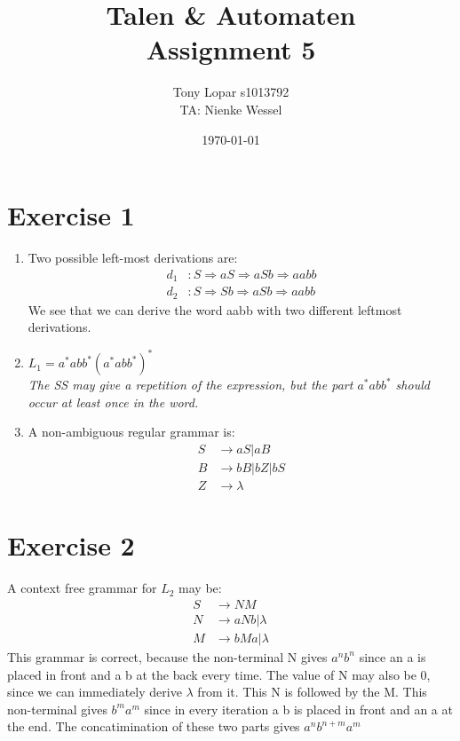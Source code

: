 \documentclass{article}
\begin{document}
\title{Talen \& Automaten \\ Assignment 5}
\date{\today}
\author{Tony Lopar \enspace s1013792 \\TA: Nienke Wessel}
\maketitle

\section*{Exercise 1}
\begin{enumerate}[label= \alph*)]
  \item Two possible left-most derivations are:
  \begin{align*}
  d_1 &: S \Rightarrow aS \Rightarrow aSb \Rightarrow aabb \\
  d_2 &: S \Rightarrow Sb \Rightarrow aSb \Rightarrow aabb
  \end{align*}
  We see that we can derive the word aabb with two different leftmost derivations.
  \item $L_1 = a^*abb^* (a^*abb^*)^*$ \\
  \emph{The SS may give a repetition of the expression, but the part $a^*abb^*$ should occur at least once in the word.}
  \item A non-ambiguous regular grammar is:
  \begin{align*}
    S &\rightarrow aS | aB \\
    B &\rightarrow bB | bZ | bS \\
    Z &\rightarrow \lambda
  \end{align*}
\end{enumerate}

\section*{Exercise 2}
A context free grammar for $L_2$ may be:
\begin{align*}
  S &\rightarrow NM \\
  N &\rightarrow aNb | \lambda \\
  M &\rightarrow bMa | \lambda
\end{align*}
This grammar is correct, because the non-terminal N gives $a^nb^n$ since an a is placed in front and a b at the back every time. The value of N may also be 0, since we can immediately derive $\lambda$ from it. This N is followed by the M. This non-terminal gives $b^ma^m$ since in every iteration a b is placed in front and an a at the end. The concatimination of these two parts gives $a^nb^{n+m}a^m$
\end{document}
